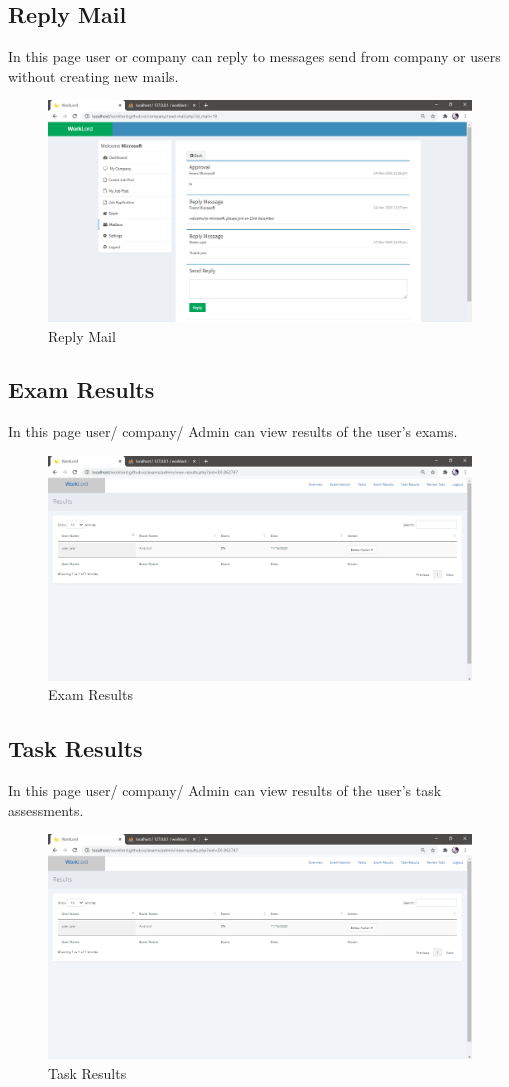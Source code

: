 \documentclass[a4paper,12pt]{report}
\begin{document}
\subsection {Reply Mail}
In this page user or company can reply to messages send from company or users without creating new mails.
\begin{figure}[bph]
	\centering
	\includegraphics[width=.7\linewidth ]{img/screenshots/replymail}
	\caption{Reply Mail}
\end{figure}

\pagebreak

\subsection {Exam Results}
In this page user/ company/ Admin can view results of the user's exams.
\begin{figure}[bph]
	\centering
	\includegraphics[width=.7\linewidth ]{img/screenshots/exams_results_pre}
	\caption{Exam Results}
\end{figure}

\subsection {Task Results}
In this page user/ company/ Admin can view results of the user's task assessments.
\begin{figure}[bph]
	\centering
	\includegraphics[width=.7\linewidth ]{img/screenshots/exams_results_pre}
	\caption{Task Results}
\end{figure}
\end{document}
